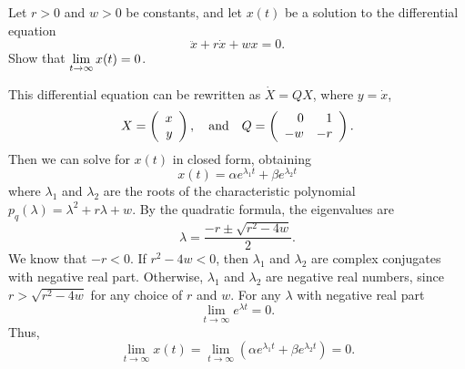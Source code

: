 \documentclass{ximera}
\begin{document}
\begin{exercise} \label{c6.7.4}
Let $r>0$ and $w>0$ be constants, and let $x(t)$ be a solution to the
differential equation
\[
\ddot{x} + r\dot{x} + wx = 0.
\]
Show that $\displaystyle\lim_{t\to\infty} x(t) = 0$.

\begin{solution}

This differential equation can be rewritten as $\dot{X} = QX$, where
$y = \dot{x}$,
\[
X = \left(\begin{array}{r} x \\ y\end{array}\right), \quad\mbox{and}\quad Q = \left(\begin{array}{rr} 0 & 1\\ -w &-r\end{array}\right).
\]
Then we can solve for $x(t)$ in closed form, obtaining
\[
x(t) = \alpha e^{\lambda_1 t} + \beta e^{\lambda_2 t}
\]
where $\lambda_1$ and $\lambda_2$ are the roots of the characteristic
polynomial $p_q(\lambda) = \lambda^2 + r\lambda + w$.  By the quadratic
formula, the eigenvalues are
\[
\lambda = \frac{-r \pm \sqrt{r^2 - 4w}}{2}.
\]
We know that $-r < 0$.  If $r^2 - 4w < 0$, then $\lambda_1$ and $\lambda_2$
are complex conjugates with negative real part.  Otherwise, $\lambda_1$
and $\lambda_2$ are negative real numbers, since $r > \sqrt{r^2 - 4w}$
for any choice of $r$ and $w$.  For any $\lambda$ with negative real part
\[
\lim_{t \rightarrow \infty} e^{\lambda t} = 0.
\]
Thus,
\[
\lim_{t \rightarrow \infty} x(t) =
\lim_{t \rightarrow \infty} (\alpha e^{\lambda_1 t} +
\beta e^{\lambda_2 t}) = 0.
\]


\end{solution}
\end{exercise}
\end{document}
